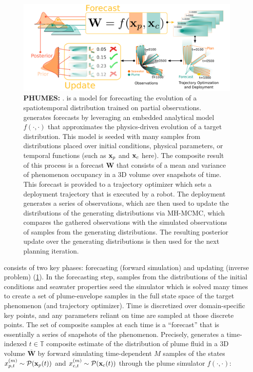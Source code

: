 \begin{figure}[h!]
    \centering
    \includegraphics[width=1\columnwidth]{figures/phumes_diagram.png}
    \caption[\PHUMES: \phumes]{\textbf{PHUMES: \phumes}. \PHUMES is a model for forecasting the evolution of a spatiotemporal distribution trained on partial observations. \PHUMES generates forecasts by leveraging an embedded analytical model $f(\cdot, \cdot)$ that approximates the physics-driven evolution of a target distribution. This model is seeded with many samples from distributions placed over initial conditions, physical parameters, or temporal functions (such as $\mathbf{x}_p$ and $\mathbf{x}_c$ here). The composite result of this process is a forecast $\mathbf{W}$ that consists of a mean and variance of phenomenon occupancy in a 3D volume over snapshots of time. This forecast is provided to a trajectory optimizer which sets a deployment trajectory that is executed by a robot. The deployment generates a series of observations, which are then used to update the distributions of the generating distributions via MH-MCMC, which compares the gathered observations with the simulated observations of samples from the generating distributions. The resulting posterior update over the generating distributions is then used for the next planning iteration.}
    \label{fig:phumes}
\end{figure}

\PHUMES consists of two key phases: forecasting (forward simulation) and updating (inverse problem) (\cref{fig:phumes}). In the forecasting step, samples from the distributions of the initial conditions and seawater properties seed the simulator which is solved many times to create a set of plume-envelope samples in the full state space of the target phenomenon (and trajectory optimizer). Time is discretized over domain-specific key points, and any parameters reliant on time are sampled at those discrete points. The set of composite samples at each time is a ``forecast'' that is essentially a series of snapshots of the phenomenon. Precisely, \PHUMES generates a time-indexed $t \in \mathbb{T}$ composite estimate of the distribution of plume fluid in a 3D volume $\overbar{\mathbf{W}}$ by forward simulating time-dependent $M$ samples of the states $x_{p,t}^{(m)} \sim \mathcal{P}(\mathbf{x}_p(t))$ and $x_{c,t}^{(m)} \sim \mathcal{P}(\mathbf{x}_c(t))$ through the plume simulator $f(\cdot, \cdot)$:

